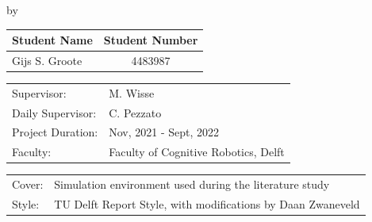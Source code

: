 \begin{titlepage}

\begin{center}

{\makeatletter
\largetitlestyle\fontsize{42}{42}\selectfont\@title
\makeatother}

{\makeatletter
\ifdefvoid{\@subtitle}{}{\bigskip\fontsize{16}{16}\selectfont\@subtitle}
\makeatother}

\bigskip
by
\bigskip

{\makeatletter
\largetitlestyle\fontsize{25}{25}\selectfont\@author
\makeatother}

\bigskip

\setlength\extrarowheight{2pt}
\begin{tabular}{lc}
    Student Name & Student Number \\\midrule
    Gijs S. Groote & 4483987 \\
\end{tabular}

\vfill

\begin{tabular}{ll}
    Supervisor: & M. Wisse \\
    Daily Supervisor: & C. Pezzato \\
    Project Duration: & Nov, 2021 - Sept, 2022 \\
    Faculty: & Faculty of Cognitive Robotics, Delft
\end{tabular}

\bigskip

\begin{tabular}{p{15mm}p{10cm}}
    Cover: & Simulation environment used during the literature study \cite{spahn_urdf-environment_2022}\\
    Style: & TU Delft Report Style, with modifications by Daan Zwaneveld
\end{tabular}
\end{center}


\end{titlepage}
